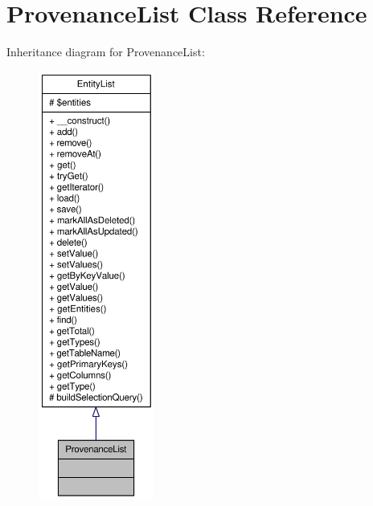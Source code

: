 \hypertarget{classProvenanceList}{
\section{ProvenanceList Class Reference}
\label{classProvenanceList}
}


Inheritance diagram for ProvenanceList:\nopagebreak
\begin{figure}[H]
\begin{center}
\leavevmode
\includegraphics[height=400pt]{classProvenanceList__inherit__graph}
\end{center}
\end{figure}


